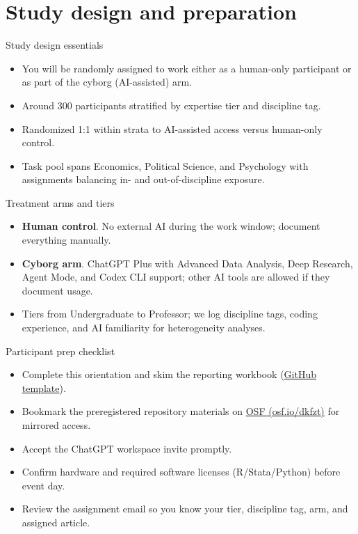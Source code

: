 \documentclass[aspectratio=169,professionalfonts]{beamer}
\begin{document}
\section{Study design and preparation}

\begin{frame}{Study design essentials}
  \begin{itemize}
    \item You will be randomly assigned to work either as a human-only participant or as part of the cyborg (AI-assisted) arm.
    \item Around 300 participants stratified by expertise tier and discipline tag.
    \item Randomized 1:1 within strata to AI-assisted access versus human-only control.
    \item Task pool spans Economics, Political Science, and Psychology with assignments balancing in- and out-of-discipline exposure.
  \end{itemize}
\end{frame}

\begin{frame}{Treatment arms and tiers}
  \begin{itemize}
    \item \textbf{Human control}. No external AI during the work window; document everything manually.
    \item \textbf{Cyborg arm}. ChatGPT Plus with Advanced Data Analysis, Deep Research, Agent Mode, and Codex CLI support; other AI tools are allowed if they document usage.
    \item Tiers from Undergraduate to Professor; we log discipline tags, coding experience, and AI familiarity for heterogeneity analyses.
  \end{itemize}
\end{frame}

\begin{frame}{Participant prep checklist}
  \begin{itemize}
    \item Complete this orientation and skim the reporting workbook (\href{https://github.com/I4Replication/AI-vertical/blob/main/Reports/Replication_Log_Referee_Template.xlsx}{GitHub template}).
    \item Bookmark the preregistered repository materials on \href{https://osf.io/dkfzt/}{OSF (osf.io/dkfzt)} for mirrored access.
    \item Accept the ChatGPT workspace invite promptly.
    \item Confirm hardware and required software licenses (R/Stata/Python) before event day.
    \item Review the assignment email so you know your tier, discipline tag, arm, and assigned article.
  \end{itemize}
\end{frame}
\end{document}
